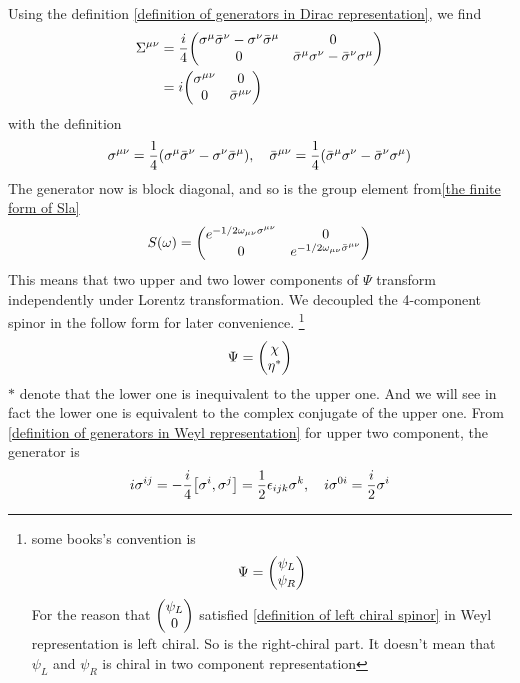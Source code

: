 Using the definition \eqref{definition of generators in Dirac representation}, we find
\begin{align}\label{definition of generators in Weyl representation}
\Si^{\m\n}
&= \frac{i}{4}
\mqty(
\s^{\m}\bar{\s}^{\n}-\s^{\n}\bar{\s}^{\m}&
0\\
0&
\bar{\s}^{\m}\s^{\n}-\bar{\s}^{\n}\s^{\m}) \notag\\
& = i \mqty(
\s^{\m\n}&
0\\
0&
\bar{\s}^{\m\n})
\end{align}
with the definition
\begin{equation}
  \sigma^{\mu\nu} =\frac{1}{4}(\sigma^{\mu}\bar{\sigma}^{\nu}-\sigma^{\nu}\bar{\sigma}^{\mu}),\quad
\bar{\sigma}^{\mu\nu}
=\frac{1}{4}(\bar{\sigma}^{\mu}\sigma^{\nu}-\bar{\sigma}^{\nu}\sigma^{\mu})
\end{equation}
The generator now is block diagonal, and so is the group element from\eqref{the finite form of Sla}
\begin{equation} \label{group element for weyl representation}
S(\w) = \mqty(
e^{-1/2\w_{\m\n}\s^{\m\n}} &
0                           \\
0                           &
e^{-1/2\w_{\m\n}\bar{\s}^{\m\n}})
\end{equation}
This means that two upper and two lower components of $\Psi$  transform independently under Lorentz transformation. We decoupled the 4-component spinor in the follow form for later convenience.
\footnote{
  some books's convention is
  \begin{equation}
     \Psi = \mqty(\admat{\psi_L \\ \psi_R})
  \end{equation}
  For the reason that $\mqty(\admat{\psi_L \\ 0})$ satisfied \eqref{definition of left chiral spinor} in Weyl representation is left chiral. So is the right-chiral part. It doesn't mean that $\psi_L$ and $\psi_R$ is chiral in two component representation
  }
\begin{equation}\label{decouple of Weyl representation}
  \Psi = \mqty(\admat{\chi \\ \h^*})
\end{equation}
$*$ denote that the lower one is inequivalent to the upper one. And we will see in fact the lower one is equivalent to the complex conjugate of the upper one.
From \eqref{definition of generators in Weyl representation} for upper two component, the generator is
\begin{equation} \label{the generator for  two component}
i\s^{ij} = -\frac{i}{4}\comm{\s^{i}}{\s^{j}} = \half\e_{ijk} \s^k ,\quad
i\s^{0i} = \frac{i}{2}\s^{i}
\end{equation}

